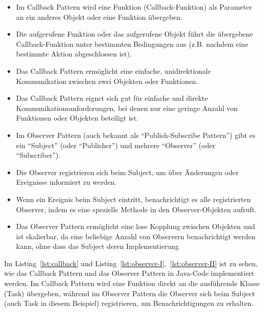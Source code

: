\begin{itemize}
\item Im Callback Pattern wird eine Funktion (Callback-Funktion) als Parameter an ein anderes Objekt oder eine Funktion übergeben.
\item Die aufgerufene Funktion oder das aufgerufene Objekt führt die übergebene Callback-Funktion unter bestimmten Bedingungen aus (z.B. nachdem eine bestimmte Aktion abgeschlossen ist).
\item Das Callback Pattern ermöglicht eine einfache, unidirektionale Kommunikation zwischen zwei Objekten oder Funktionen.
\item Das Callback Pattern eignet sich gut für einfache und direkte Kommunikationsanforderungen, bei denen nur eine geringe Anzahl von Funktionen oder Objekten beteiligt ist.
\end{itemize}
\begin{itemize}
\item Im Observer Pattern (auch bekannt als \enquote{Publish-Subscribe Pattern}) gibt es ein \enquote{Subject} (oder \enquote{Publisher}) und mehrere \enquote{Observer} (oder \enquote{Subscriber}).
\item Die Observer registrieren sich beim Subject, um über Änderungen oder Ereignisse informiert zu werden.
\item Wenn ein Ereignis beim Subject eintritt, benachrichtigt es alle registrierten Observer, indem es eine spezielle Methode in den Observer-Objekten aufruft.
\item Das Observer Pattern ermöglicht eine lose Kopplung zwischen Objekten und ist skalierbar, da eine beliebige Anzahl von Observern benachrichtigt werden kann, ohne dass das Subject deren Implementierung
\end{itemize}
Im Listing~\ref{lst:callback} und Listing~\ref{lst:observer-I},~\ref{lst:observer-II} ist zu sehen, wie das Callback Pattern und das Observer Pattern in Java-Code implementiert werden. Im Callback Pattern wird eine Funktion direkt an die ausführende Klasse (Task) übergeben, während im Observer Pattern die Observer sich beim Subject (auch Task in diesem Beispiel) registrieren, um Benachrichtigungen zu erhalten.

